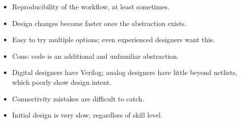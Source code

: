 \documentclass[aspectratio=169]{beamer}
\begin{document}
\begin{frame}
{\begin{itemize}
    \item Reproducibility of the workflow, at least sometimes.
    \item Design changes become faster once the abstraction exists.
    \item Easy to try multiple options; even experienced designers want this.
    \item Cons: code is an additional and unfamiliar abstraction.
    \item Digital designers have Verilog; analog designers have little beyond netlists, which poorly show design intent.
    \item Connectivity mistakes are difficult to catch.
    \item Initial design is very slow, regardless of skill level.
  \end{itemize}}
\end{frame}
\end{document}
